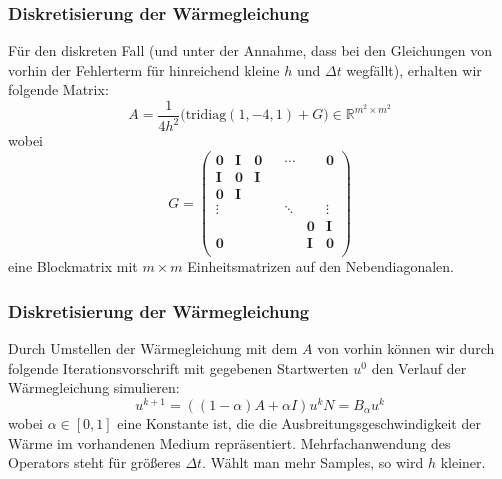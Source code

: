 \documentclass[xcolor = dvipsnames, notheorems]{beamer}
\theoremstyle{definition}
\begin{document}
\begin{frame}
\frametitle{Diskretisierung der Wärmegleichung}
	Für den diskreten Fall (und unter der Annahme, dass bei den Gleichungen von vorhin der Fehlerterm für hinreichend kleine $h$ und $\Delta t$ wegfällt), erhalten wir folgende Matrix:
	$$
		A = \frac{1}{4h^2}\bigg(\text{tridiag}(1,-4,1) + G \bigg) \in \mathbb{R}^{m^2 \times m^2}
	$$
	wobei
	$$
	G =\begin{pmatrix}
			\mathbf{0} 	& \mathbf{I} 	& \mathbf{0} 	& 				& \cdots 		&				& \mathbf{0} 	\\
			\mathbf{I}	& \mathbf{0} 	& \mathbf{I} 	& 				&				& 				&			 	\\
			\mathbf{0}	& \mathbf{I}	&				& 				& 				&				&				\\
			\vdots		&				&				& 				& \ddots		&				& \vdots		\\
						&				&				&				&				& \mathbf{0}	& \mathbf{I}	\\
			\mathbf{0}	&				&				&				&				& \mathbf{I}	& \mathbf{0}	\\
		\end{pmatrix}
	$$
	eine Blockmatrix mit $m \times m$ Einheitsmatrizen auf den Nebendiagonalen.
\end{frame}
\begin{frame}
\frametitle{Diskretisierung der Wärmegleichung}
	Durch Umstellen der Wärmegleichung mit dem $A$ von vorhin können wir durch folgende Iterationsvorschrift mit gegebenen Startwerten $u^0$ den Verlauf der Wärmegleichung simulieren:
	$$u^{k+1} = ((1-\alpha) A+ \alpha I)u^k N = B_{\alpha}u^k$$
	wobei $\alpha \in [0,1]$ eine Konstante ist, die die Ausbreitungsgeschwindigkeit der Wärme im vorhandenen Medium repräsentiert. Mehrfachanwendung des Operators steht für größeres $\Delta t$. Wählt man mehr Samples, so wird $h$ kleiner.
\end{frame}
\end{document}
